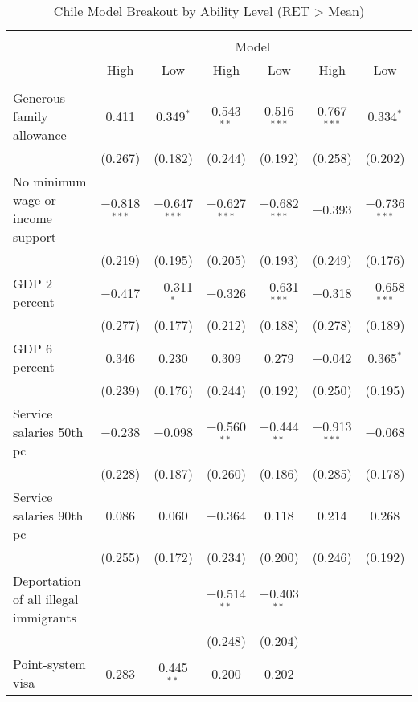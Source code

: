 
\begin{sidewaystable}[!htbp] \centering 
  \caption{Chile Model Breakout by Ability Level (RET > Mean)} 
  \label{tab:chile_ability} 
\begin{tabular}{@{\extracolsep{5pt}}lcccccc} 
\\[-1.8ex]\hline 
\hline \\[-1.8ex] 
 & \multicolumn{6}{c}{Model} \\ 
\cline{2-7} 
 & High & Low & High & Low & High & Low \\ 
\hline \\[-1.8ex] 
 Generous family allowance & 0.411 & 0.349$^{*}$ & 0.543$^{**}$ & 0.516$^{***}$ & 0.767$^{***}$ & 0.334$^{*}$ \\ 
  & (0.267) & (0.182) & (0.244) & (0.192) & (0.258) & (0.202) \\ 
  No minimum wage or income support & $-$0.818$^{***}$ & $-$0.647$^{***}$ & $-$0.627$^{***}$ & $-$0.682$^{***}$ & $-$0.393 & $-$0.736$^{***}$ \\ 
  & (0.219) & (0.195) & (0.205) & (0.193) & (0.249) & (0.176) \\ 
  GDP 2 percent & $-$0.417 & $-$0.311$^{*}$ & $-$0.326 & $-$0.631$^{***}$ & $-$0.318 & $-$0.658$^{***}$ \\ 
  & (0.277) & (0.177) & (0.212) & (0.188) & (0.278) & (0.189) \\ 
  GDP 6 percent & 0.346 & 0.230 & 0.309 & 0.279 & $-$0.042 & 0.365$^{*}$ \\ 
  & (0.239) & (0.176) & (0.244) & (0.192) & (0.250) & (0.195) \\ 
  Service salaries 50th pc & $-$0.238 & $-$0.098 & $-$0.560$^{**}$ & $-$0.444$^{**}$ & $-$0.913$^{***}$ & $-$0.068 \\ 
  & (0.228) & (0.187) & (0.260) & (0.186) & (0.285) & (0.178) \\ 
  Service salaries 90th pc & 0.086 & 0.060 & $-$0.364 & 0.118 & 0.214 & 0.268 \\ 
  & (0.255) & (0.172) & (0.234) & (0.200) & (0.246) & (0.192) \\ 
  Deportation of all illegal immigrants &  &  & $-$0.514$^{**}$ & $-$0.403$^{**}$ &  &  \\ 
  &  &  & (0.248) & (0.204) &  &  \\ 
  Point-system visa & 0.283 & 0.445$^{**}$ & 0.200 & 0.202 &  &  \\ 

\end{tabular}
\end{sidewaystable}
